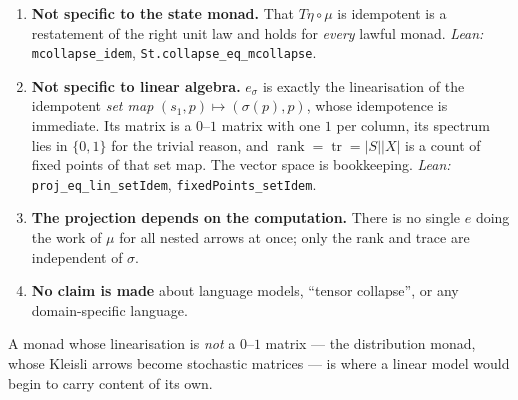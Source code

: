 \documentclass[12pt]{article}
\theoremstyle{plain}
\theoremstyle{remark}
\begin{document}
\begin{enumerate}
  \item \textbf{Not specific to the state monad.} That $T\eta\circ\mu$ is
        idempotent is a restatement of the right unit law and holds for
        \emph{every} lawful monad. \emph{Lean:} \verb|mcollapse_idem|,
        \verb|St.collapse_eq_mcollapse|.
  \item \textbf{Not specific to linear algebra.} $e_\sigma$ is exactly the
        linearisation of the idempotent \emph{set map}
        $(s_1,p)\mapsto(\sigma(p),p)$, whose idempotence is immediate. Its
        matrix is a $0$--$1$ matrix with one $1$ per column, its spectrum lies
        in $\{0,1\}$ for the trivial reason, and $\operatorname{rank}=
        \operatorname{tr}=|S||X|$ is a count of fixed points of that set map.
        The vector space is bookkeeping. \emph{Lean:}
        \verb|proj_eq_lin_setIdem|, \verb|fixedPoints_setIdem|.
  \item \textbf{The projection depends on the computation.} There is no single
        $e$ doing the work of $\mu$ for all nested arrows at once; only the rank
        and trace are independent of $\sigma$.
  \item \textbf{No claim is made} about language models, ``tensor collapse'', or
        any domain-specific language.
\end{enumerate}

A monad whose linearisation is \emph{not} a $0$--$1$ matrix --- the distribution
monad, whose Kleisli arrows become stochastic matrices --- is where a linear
model would begin to carry content of its own.
\end{document}
